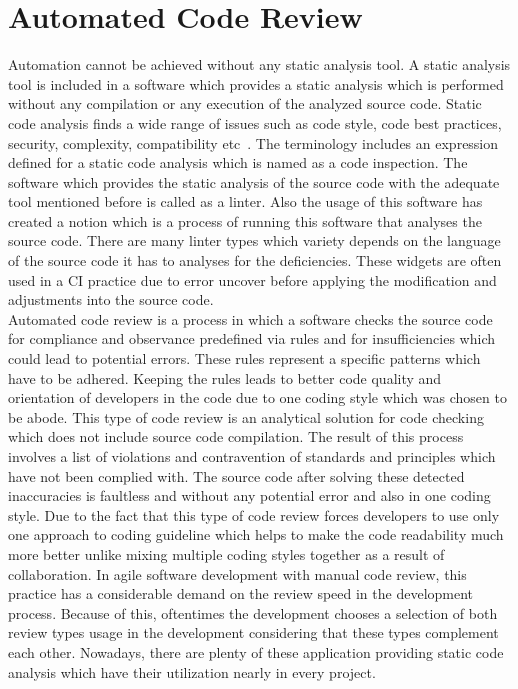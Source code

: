 \section{Automated Code Review}

Automation cannot be achieved without any static analysis tool. A static analysis tool is included in a software which provides a static analysis which is performed without any compilation or any execution of the analyzed source code. Static code analysis finds a wide range of issues such as code style, code best practices, security, complexity, compatibility etc~\cite{codacy}. The terminology includes an expression defined for a static code analysis which is named as a code inspection. The software which provides the static analysis of the source code with the adequate tool mentioned before is called as a linter. Also the usage of this software has created a notion  which is a process of running this software that analyses the source code. There are many linter types which variety depends on the language of the source code it has to analyses for the deficiencies. These widgets are often used in a CI practice due to error uncover before applying the modification and adjustments into the source code.\\

Automated code review is a process in which a software checks the source code for compliance and observance predefined via rules and for insufficiencies which could lead to potential errors. These rules represent a specific patterns which have to be adhered. Keeping the rules leads to better code quality and orientation of developers in the code due to one coding style which was chosen to be abode. This type of code review is an analytical solution for code checking which does not include source code compilation. The result of this process involves a list of violations and contravention of standards and principles which have not been complied with. The source code after solving these detected inaccuracies is faultless and without any potential error and also in one coding style. Due to the fact that this type of code review forces developers to use only one approach to coding guideline which helps to make the code readability much more better unlike mixing multiple coding styles together as a result of collaboration. In agile software development with manual code review, this practice has a considerable demand on the review speed in the development process. Because of this, oftentimes the development chooses a selection of both review types usage in the development considering that these types complement each other. Nowadays, there are plenty of these application providing static code analysis which have their utilization nearly in every project.

